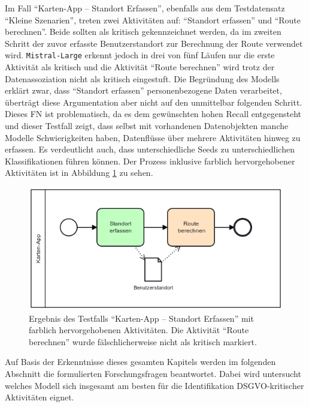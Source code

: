 Im Fall \enquote{Karten-App – Standort Erfassen}, ebenfalls aus dem Testdatensatz \enquote{Kleine Szenarien}, treten zwei Aktivitäten auf: \enquote{Standort erfassen} und \enquote{Route berechnen}. Beide sollten als kritisch gekennzeichnet werden, da im zweiten Schritt der zuvor erfasste Benutzerstandort zur Berechnung der Route verwendet wird. \texttt{Mistral-Large} erkennt jedoch in drei von fünf Läufen nur die erste Aktivität als kritisch und die Aktivität \enquote{Route berechnen} wird trotz der Datenassoziation nicht als kritisch eingestuft. Die Begründung des Modells erklärt zwar, dass \enquote{Standort erfassen} personenbezogene Daten verarbeitet, überträgt diese Argumentation aber nicht auf den unmittelbar folgenden Schritt. Dieses \ac{FN} ist problematisch, da es dem gewünschten hohen Recall entgegensteht und dieser Testfall zeigt, dass selbst mit vorhandenen Datenobjekten manche Modelle Schwierigkeiten haben, Datenflüsse über mehrere Aktivitäten hinweg zu erfassen. Es verdeutlicht auch, dass unterschiedliche Seeds zu unterschiedlichen Klassifikationen führen können. Der Prozess inklusive farblich hervorgehobener Aktivitäten ist in Abbildung \ref{fig:mistral-fall} zu sehen.

\begin{figure}
    \centering
    \includegraphics[width=.55\textwidth]{images/results/examples/mistral-large-run-3-small-maps-app}
    \caption{Ergebnis des Testfalls \enquote{Karten-App – Standort Erfassen} mit farblich hervorgehobenen Aktivitäten. Die Aktivität \enquote{Route berechnen} wurde fälschlicherweise nicht als kritisch markiert.}
    \label{fig:mistral-fall}
\end{figure}

Auf Basis der Erkenntnisse dieses gesamten Kapitels werden im folgenden Abschnitt die formulierten Forschungsfragen beantwortet. Dabei wird untersucht welches Modell sich insgesamt am besten für die Identifikation \ac{DSGVO}‑kritischer Aktivitäten eignet.